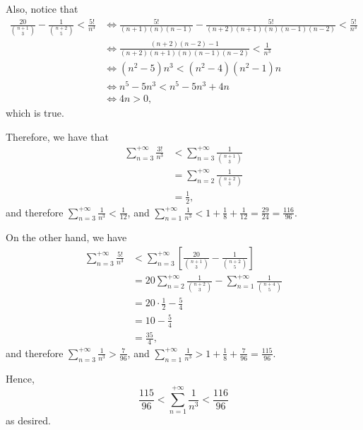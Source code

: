 \begin{enumerate}
    Also, notice that
    \begin{align*}
        \frac{20}{\binom{n+1}{3}} - \frac{1}{\binom{n+2}{5}} < \frac{5!}{n^3} &\iff \frac{5!}{(n+1)(n)(n-1)} - \frac{5!}{(n+2)(n+1)(n)(n-1)(n-2)} < \frac{5!}{n^3}\\
        &\iff \frac{(n+2)(n-2) - 1}{(n+2)(n+1)(n)(n-1)(n-2)} < \frac{1}{n^3}\\
        &\iff (n^2 - 5)n^3 < (n^2 - 4)(n^2 - 1)n\\
        &\iff n^5 - 5n^3 < n^5 - 5n^3 + 4n\\
        &\iff 4n > 0,
    \end{align*}
    which is true.

    Therefore, we have that
    \begin{align*}
        \sum_{n = 3}^{+\infty} \frac{3!}{n^3} &< \sum_{n = 3}^{+\infty} \frac{1}{\binom{n+1}{3}}\\
        &= \sum_{n = 2}^{+\infty} \frac{1}{\binom{n+2}{3}}\\
        &= \frac{1}{2},
    \end{align*}
    and therefore \(\sum_{n = 3}^{+\infty} \frac{1}{n^3} < \frac{1}{12}\), and \(\sum_{n = 1}^{+\infty} \frac{1}{n^3} < 1 + \frac{1}{8} + \frac{1}{12} = \frac{29}{24} = \frac{116}{96}.\)

    On the other hand, we have
    \begin{align*}
        \sum_{n = 3}^{+\infty} \frac{5!}{n^3} &< \sum_{n = 3}^{+\infty} \left[\frac{20}{\binom{n+1}{3}} - \frac{1}{\binom{n+2}{5}}\right]\\
        &= 20 \sum_{n = 2}^{+\infty} \frac{1}{\binom{n+2}{3}} - \sum_{n = 1}^{+\infty} \frac{1}{\binom{n+4}{5}}\\
        &= 20 \cdot \frac{1}{2} - \frac{5}{4}\\
        &= 10 - \frac{5}{4}\\
        &= \frac{35}{4},
    \end{align*}
    and therefore \(\sum_{n = 3}^{+\infty} \frac{1}{n^3} > \frac{7}{96}\), and \(\sum_{n = 1}^{+\infty} \frac{1}{n^3} > 1 + \frac{1}{8} + \frac{7}{96} = \frac{115}{96}\).

    Hence,
    \[
        \frac{115}{96} < \sum_{n = 1}^{+\infty} \frac{1}{n^3} < \frac{116}{96}
    \]
    as desired.
\end{enumerate}